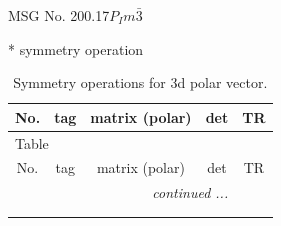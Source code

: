 \documentclass[fleqn,8pt]{jsarticle}
\begin{document}
\setcounter{MaxMatrixCols}{32}

\renewcommand{\tablename}{Table~}
\renewcommand{\figurename}{Figure~}
\begin{center}
\LARGE
MSG No. 200.17\quad$P_{I}m\bar{3}$
\end{center}
* symmetry operation
\renewcommand{\arraystretch}{1.3}
\begin{longtable}{ccccc}
\caption{Symmetry operations for 3d polar vector.}
 \\
 \hline \hline
No. & tag & matrix (polar) & det & TR \\ \hline \endfirsthead

\multicolumn{4}{l}{\tablename\ \thetable{}} \\
 \hline \hline
No. & tag & matrix (polar) & det & TR \\ \hline \endhead

 \hline \hline
\multicolumn{4}{r}{\footnotesize\it continued ...} \\ \endfoot

 \hline \hline
\multicolumn{4}{r}{} \\ \endlastfoot


\end{longtable}
\end{document}
